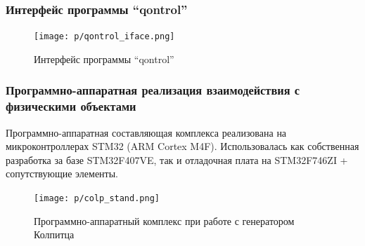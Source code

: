 \documentclass[10pt,utf8]{beamer}
\begin{document}

\begin{frame}
  \frametitle{Интерфейс программы ``qontrol''}

  \begin{figure}[ht!]
    \centerline{\texttt{[image: p/qontrol\_iface.png]} }
    \caption{Интерфейс программы ``qontrol'' }
    \label{atu:qontrol_iface}
  \end{figure}

\end{frame}




\begin{frame}
  \frametitle{Программно-аппаратная реализация взаимодействия с физическими объектами}

  Программно-аппаратная составляющая комплекса реализована
  на микроконтроллерах STM32 (ARM Cortex M4F).
  Использовалась как собственная разработка за базе STM32F407VE,
  так и отладочная плата на STM32F746ZI + сопутствующие элементы.

  \begin{figure}[ht!]
    \centerline{\texttt{[image: p/colp\_stand.png]} }
    \caption{Программно-аппаратный комплекс при работе с генератором Колпитца}
    \label{atu:colp_stand}
  \end{figure}


\end{frame}


%
%
%
%
%
%
%
%
%



\end{document}
